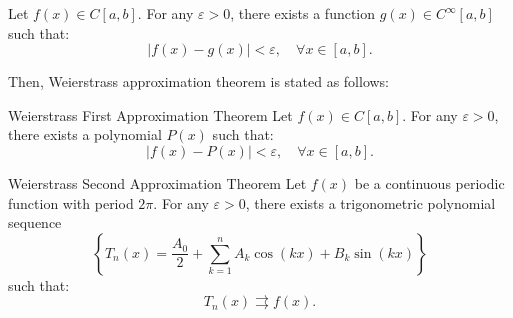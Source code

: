 \begin{theorem}
    Let \( f(x) \in C[a, b] \). For any \( \varepsilon > 0 \), 
    there exists a function \( g(x) \in C^{\infty}[a, b] \) such that:
    \[
    |f(x) - g(x)| < \varepsilon, \quad \forall x \in [a, b].
    \]
\end{theorem}

Then, Weierstrass approximation theorem is stated as follows:
\begin{theorem}{Weierstrass First Approximation Theorem}
    Let \( f(x) \in C[a, b] \). For any \( \varepsilon > 0 \), 
    there exists a polynomial \( P(x) \) such that:
    \[
    |f(x) - P(x)| < \varepsilon, \quad \forall x \in [a, b].
    \]
\end{theorem}

\begin{theorem}{Weierstrass Second Approximation Theorem}
    Let \(f(x)\) be a continuous periodic function with period \(2\pi\). For any \( \varepsilon > 0 \), 
    there exists a trigonometric polynomial sequence
    \[
    \left\{ T_{n}(x)=\frac{A_{0}}{2} + \sum_{k=1}^{n} A_{k} \cos(kx) + B_{k} \sin(kx) \right\}
    \]
    such that:
    \[
    T_{n}(x) \mathop{\rightrightarrows} f(x).
    \]
\end{theorem}
